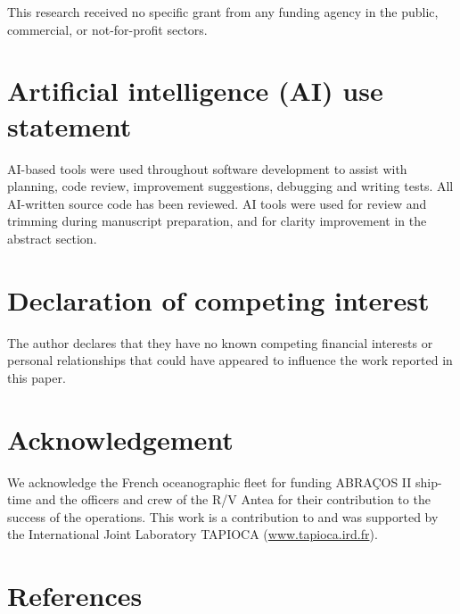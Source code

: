 \documentclass[
  number,
  preprint,
  3p]{elsarticle}
\begin{document}
This research received no specific grant from any funding agency in the
public, commercial, or not-for-profit sectors.

\section*{Artificial intelligence (AI) use
statement}\label{artificial-intelligence-ai-use-statement}

AI-based tools were used throughout software development to assist with
planning, code review, improvement suggestions, debugging and writing
tests. All AI-written source code has been reviewed. AI tools were used
for review and trimming during manuscript preparation, and for clarity
improvement in the abstract section.

\section*{Declaration of competing
interest}\label{declaration-of-competing-interest}

The author declares that they have no known competing financial
interests or personal relationships that could have appeared to
influence the work reported in this paper.

\section*{Acknowledgement}\label{acknowledgement}

We acknowledge the French oceanographic fleet for funding ABRAÇOS II
ship-time and the officers and crew of the R/V Antea for their
contribution to the success of the operations. This work is a
contribution to and was supported by the International Joint Laboratory
TAPIOCA (\href{https://www.tapioca.ird.fr}{www.tapioca.ird.fr}).

\section*{References}\label{references}

\renewcommand{\bibsection}{}

\end{document}
